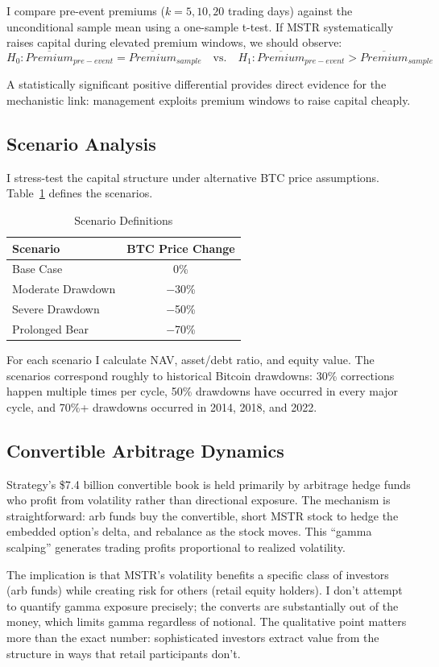 I compare pre-event premiums ($k = 5, 10, 20$ trading days) against the unconditional sample mean using a one-sample t-test. If MSTR systematically raises capital during elevated premium windows, we should observe:
\begin{equation}
    H_0: \overline{Premium}_{pre-event} = \overline{Premium}_{sample} \quad \text{vs.} \quad H_1: \overline{Premium}_{pre-event} > \overline{Premium}_{sample}
\end{equation}

A statistically significant positive differential provides direct evidence for the mechanistic link: management exploits premium windows to raise capital cheaply.

\subsection{Scenario Analysis}

I stress-test the capital structure under alternative BTC price assumptions. Table~\ref{tab:scenarios} defines the scenarios.

\begin{table}[H]
\centering
\caption{Scenario Definitions}
\label{tab:scenarios}
\begin{tabular}{@{}lc@{}}
\toprule
\textbf{Scenario} & \textbf{BTC Price Change} \\
\midrule
Base Case & 0\% \\
Moderate Drawdown & $-$30\% \\
Severe Drawdown & $-$50\% \\
Prolonged Bear & $-$70\% \\
\bottomrule
\end{tabular}
\end{table}

For each scenario I calculate NAV, asset/debt ratio, and equity value. The scenarios correspond roughly to historical Bitcoin drawdowns: 30\% corrections happen multiple times per cycle, 50\% drawdowns have occurred in every major cycle, and 70\%+ drawdowns occurred in 2014, 2018, and 2022.

\subsection{Convertible Arbitrage Dynamics}

Strategy's \$7.4 billion convertible book is held primarily by arbitrage hedge funds who profit from volatility rather than directional exposure. The mechanism is straightforward: arb funds buy the convertible, short MSTR stock to hedge the embedded option's delta, and rebalance as the stock moves. This ``gamma scalping'' generates trading profits proportional to realized volatility.

The implication is that MSTR's volatility benefits a specific class of investors (arb funds) while creating risk for others (retail equity holders). I don't attempt to quantify gamma exposure precisely; the converts are substantially out of the money, which limits gamma regardless of notional. The qualitative point matters more than the exact number: sophisticated investors extract value from the structure in ways that retail participants don't.


